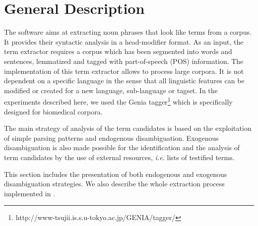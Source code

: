\section{General Description}
The software \YaTeA aims at extracting noun phrases that look like
terms from a corpus. It provides their syntactic analysis
in a head-modifier format. 
As an input, the term extractor requires a corpus which has been
segmented into 
words and sentences, lemmatized and tagged with part-of-speech (POS)
information. The implementation of this term extractor allows to process large corpora.
It is  not dependent on a specific language
in the sense that all linguistic features can be modified or created
for a new language, sub-language or tagset. %
In the experiments described here, we used the
Genia
tagger\footnote{http://www-tsujii.is.s.u-tokyo.ac.jp/GENIA/tagger/} \cite{Tsuruoka&al2005}
which is specifically designed for
biomedical corpora.


The main strategy of analysis of the term candidates is
based on the exploitation of simple parsing patterns and endogenous disambiguation. Exogenous disambiguation is also made
possible for the identification and the analysis of term candidates by the use of external resources, \textit{i.e.} lists of
testified terms. 

This section includes the presentation of  both endogenous and
exogenous disambiguation strategies. We also describe the whole
extraction process implemented in \YaTeA.





